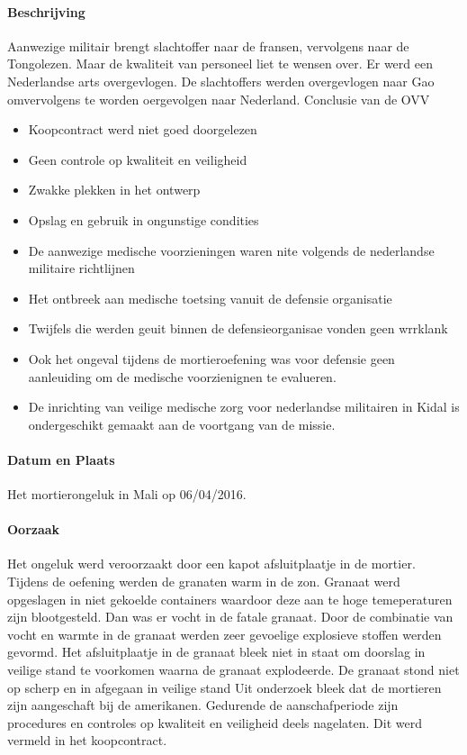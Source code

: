 \documentclass{article}
\begin{document}
	\paragraph{Beschrijving}
	Aanwezige militair brengt slachtoffer naar de fransen, vervolgens naar de Tongolezen. Maar de kwaliteit van personeel liet te wensen over.
	Er werd een Nederlandse arts overgevlogen. De slachtoffers werden overgevlogen naar Gao omvervolgens te worden oergevolgen naar Nederland.
	Conclusie van de OVV\cite{bnnvara13062018malirapport}
	\begin{itemize}
		\item Koopcontract werd niet goed doorgelezen
		\item Geen controle op kwaliteit en veiligheid
		\item Zwakke plekken in het ontwerp
		\item Opslag en gebruik in ongunstige condities
		\item De aanwezige medische voorzieningen waren nite volgends de nederlandse militaire richtlijnen
		\item Het ontbreek aan medische toetsing vanuit de defensie organisatie
		\item Twijfels die werden geuit binnen de defensieorganisae vonden geen wrrklank
		\item Ook het ongeval tijdens de mortieroefening was voor defensie geen aanleuiding om de medische voorzienignen te evalueren.
		\item De inrichting van veilige medische zorg voor nederlandse militairen in Kidal is ondergeschikt gemaakt aan de voortgang van de missie.
	\end{itemize}
	\paragraph{Datum en Plaats}
	
	\newline \indent Het mortierongeluk in Mali op 06/04/2016. 
	\paragraph{Oorzaak}
	Het ongeluk werd veroorzaakt door een kapot afsluitplaatje in de mortier.    Tijdens de oefening werden de granaten warm in de zon. 
	Granaat werd opgeslagen in niet  gekoelde containers waardoor deze aan te hoge temeperaturen zijn blootgesteld.  Dan was er vocht in de fatale granaat.
	Door de combinatie van vocht en warmte in de granaat werden zeer gevoelige explosieve stoffen werden gevormd.
	Het afsluitplaatje in de granaat bleek niet in staat om doorslag in veilige stand te voorkomen waarna de granaat explodeerde.
	De granaat stond niet op scherp en in afgegaan in veilige stand
	Uit onderzoek bleek dat de  mortieren zijn aangeschaft bij de amerikanen. Gedurende de aanschafperiode zijn procedures en controles op kwaliteit en veiligheid deels nagelaten.
	Dit  werd vermeld in het koopcontract.
	
\end{document}
